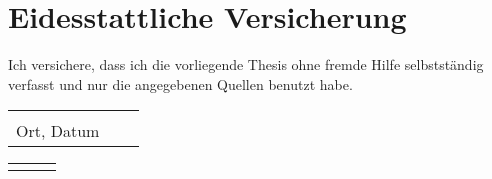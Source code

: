 %
%
\chapter*{Eidesstattliche Versicherung}
\thispagestyle{empty}

Ich versichere, dass ich die vorliegende Thesis ohne fremde Hilfe selbstständig verfasst und nur die angegebenen Quellen benutzt habe.

\vspace{4cm}

\vspace{1,5 cm} 
\begin{tabular}{p{6cm}p{.5cm}l}
\hrulefill  \\
\centering Ort, Datum
\end{tabular}%
\hfill
\begin{tabular}{p{7cm}p{.5cm}l}
\hrulefill \\
\end{tabular}%

